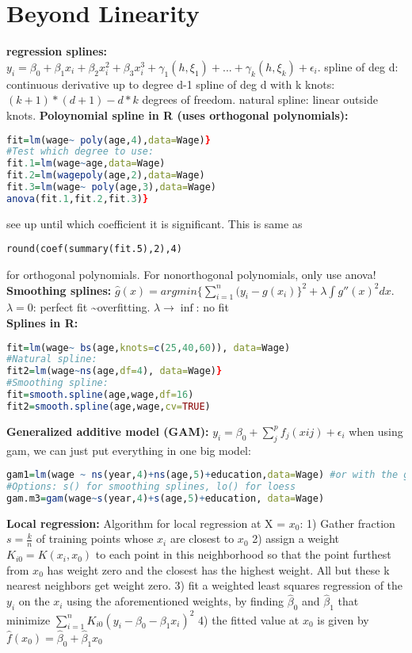 \section{Beyond Linearity}
\textbf{regression splines: } 
$y_i = \beta_0 + \beta_1x_i + \beta_2x_i^2 + \beta_3x_i^3 + \gamma_1(h, \xi_1) + ... + \gamma_k(h, \xi_k) + \epsilon_i$.
spline of deg d: continuous derivative up to degree d-1
spline of deg d with k knots: $(k+1)*(d+1)-d*k$ degrees of freedom. 
natural spline: linear outside knots. 
\textbf{Poloynomial spline in R (uses orthogonal polynomials):} \begin{lstlisting}[language=R]
fit=lm(wage~ poly(age,4),data=Wage)}
#Test which degree to use:
fit.1=lm(wage~age,data=Wage)
fit.2=lm(wagepoly(age,2),data=Wage)
fit.3=lm(wage~ poly(age,3),data=Wage)
anova(fit.1,fit.2,fit.3)}\end{lstlisting} see up until which coefficient it is significant. This is same as \begin{lstlisting}
round(coef(summary(fit.5),2),4)
\end{lstlisting} for orthogonal polynomials. For nonorthogonal polynomials, only use anova! \\
\textbf{Smoothing splines: } $\hat g(x) = argmin \{\sum_{i=1}^n (y_i - g(x_i)\}^2 + \lambda \int g'' (x)^2 dx$. $\lambda = 0$: perfect fit \textasciitilde overfitting. $\lambda \rightarrow \inf$: no fit \\
\textbf{Splines in R:}
\begin{lstlisting}[language=R] 
fit=lm(wage~ bs(age,knots=c(25,40,60)), data=Wage)
#Natural spline: 
fit2=lm(wage~ns(age,df=4), data=Wage)}
#Smoothing spline:
fit=smooth.spline(age,wage,df=16)
fit2=smooth.spline(age,wage,cv=TRUE)
\end{lstlisting}
\textbf{Generalized additive model (GAM): } $y_i = \beta_0 + \sum_j^p f_j(xij) + \epsilon_i$
when using gam, we can just put everything in one big model:
\begin{lstlisting}[language=R]
gam1=lm(wage ~ ns(year,4)+ns(age,5)+education,data=Wage) #or with the gam library: 
#Options: s() for smoothing splines, lo() for loess
gam.m3=gam(wage~s(year,4)+s(age,5)+education, data=Wage)\end{lstlisting}

\textbf{Local regression: }
Algorithm for local regression at X = $x_0$: 1) Gather fraction $s = \frac{k}{n}$ of training points whose $x_i$ are closest to $x_0$ 2) assign a weight $K_{i0} = K(x_i, x_0)$ to each point in this neighborhood so that the point furthest from $x_0$ has weight zero and the closest has the highest weight. All but these k nearest neighbors get weight zero. 3) fit a weighted least squares regression of the $y_i$ on the $x_i$ using the aforementioned weights, by finding $\hat \beta_0$ and $\hat \beta_1$ that minimize $\sum_{i=1}^n K_{i0}(y_i-\beta_0-\beta_1x_i)^2$ 4) the fitted value at $x_0$ is given by $\hat f(x_0) = \hat \beta_0 + \hat \beta_1 x_0$